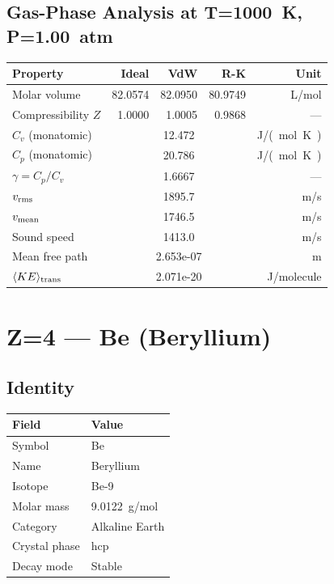 \documentclass[11pt,a4paper]{article}
\begin{document}
\subsection{Gas-Phase Analysis at T=\SI{1000}{K}, P=\SI{1.00}{atm}}
\begin{tabular}{lrrrr}
  \toprule
  Property & Ideal & VdW & R-K & Unit \\
  \midrule
  Molar volume & 82.0574 & 82.0950 & 80.9749 & \si{L/mol} \\
  Compressibility $Z$ & 1.0000 & 1.0005 & 0.9868 & --- \\
  \midrule
  $C_v$ (monatomic) & \multicolumn{3}{c}{12.472} & \si{J/(mol.K)} \\
  $C_p$ (monatomic) & \multicolumn{3}{c}{20.786} & \si{J/(mol.K)} \\
  $\gamma = C_p/C_v$ & \multicolumn{3}{c}{1.6667} & --- \\
  $v_{\rm rms}$ & \multicolumn{3}{c}{1895.7} & \si{m/s} \\
  $v_{\rm mean}$ & \multicolumn{3}{c}{1746.5} & \si{m/s} \\
  Sound speed & \multicolumn{3}{c}{1413.0} & \si{m/s} \\
  Mean free path & \multicolumn{3}{c}{2.653e-07} & \si{m} \\
  $\langle KE \rangle_{\rm trans}$ & \multicolumn{3}{c}{2.071e-20} & \si{J/molecule} \\
  \bottomrule
\end{tabular}

\newpage

\section{Z=4 --- Be (Beryllium)}
\label{sec:Z4}

\subsection{Identity}
\begin{tabular}{ll}
  \toprule
  Field & Value \\
  \midrule
  Symbol & Be \\
  Name & Beryllium \\
  Isotope & Be-9 \\
  Molar mass & \SI{9.0122}{g/mol} \\
  Category & Alkaline Earth \\
  Crystal phase & hcp \\
  Decay mode & Stable \\
  \bottomrule
\end{tabular}
\end{document}
